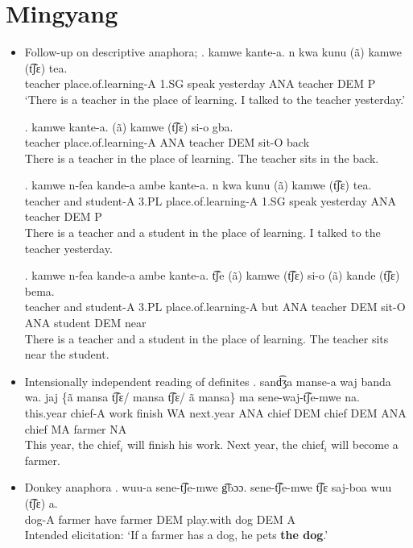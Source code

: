 \documentclass{assets/fieldnotes}
\begin{document}
\section{Mingyang}
\begin{itemize}
    \item Follow-up on descriptive anaphora;
    \exg. kamwe kante-a. n kwa kunu (ã) kamwe (t͡ʃɛ) tea.\\
        teacher place.of.learning-A 1.SG speak yesterday ANA teacher DEM P\\
   `There is a teacher in the place of learning. I talked to the teacher yesterday.'

   \exg. kamwe kante-a. (ã) kamwe (t͡ʃɛ) si-o gba.\\
   teacher place.of.learning-A ANA teacher DEM sit-O back\\ 
   There is a teacher in the place of learning. The teacher sits in the back.

   \exg. kamwe n-fea kande-a ambe kante-a. n kwa kunu (ã) kamwe (t͡ʃɛ) tea.\\
   teacher and student-A 3.PL place.of.learning-A 1.SG speak yesterday ANA teacher DEM P\\
   There is a teacher and a student in the place of learning. I talked to the teacher yesterday.
   
   \exg. kamwe n-fea kande-a ambe kante-a. t͡ʃe (ã) kamwe (t͡ʃɛ) si-o (ã) kande (t͡ʃɛ) bema.\\
   teacher and student-A 3.PL place.of.learning-A but ANA teacher DEM sit-O ANA student DEM near\\
   There is a teacher and a student in the place of learning. The teacher sits near the student.

   \item Intensionally independent reading of definites
   \exg. sand͡ʒa manse-a waj banda wa. jaj \{ã mansa t͡ʃɛ/ mansa t͡ʃɛ/ ã mansa\} ma sene-waj-t͡ʃe-mwe na.\\
    this.year chief-A work finish WA next.year ANA chief DEM chief DEM ANA chief MA farmer NA\\
   This year, the chief$_i$ will finish his work. Next year, the chief$_i$ will become a farmer.

    

   \item Donkey anaphora 
    \exg. wuu-a sene-t͡ʃe-mwe g͡bɔɔ. sene-t͡ʃe-mwe t͡ʃɛ saj-boa wuu (t͡ʃɛ) a.\\
    dog-A farmer have farmer DEM play.with dog DEM A\\
    Intended elicitation: `If a farmer has a dog, he pets \textbf{the dog}.'
    

   
\end{itemize}
\end{document}
